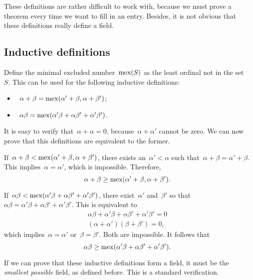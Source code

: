 \begin{remark}
  These definitions are rather difficult to work with, because we must prove a theorem every time we want to fill in an entry. Besides, it is not obvious that these definitions really define a field.
\end{remark}

\subsection{Inductive definitions}
Define the minimal excluded number~$\operatorname{mex}(S)$ as the least ordinal not in the set~$S$. This can be used for the following inductive definitions:
\begin{itemize}
  \item~$\alpha + \beta = \operatorname{mex}(\alpha' + \beta, \alpha + \beta')$;
	\item~$\alpha\beta = \operatorname{mex}(\alpha'\beta + \alpha\beta' + \alpha'\beta')$.
\end{itemize}
It is easy to verify that~$\alpha + \alpha = 0$, because~$\alpha + \alpha'$ cannot be zero. We can now prove that this definitions are equivalent to the former.

If~$\alpha + \beta < \operatorname{mex}(\alpha' + \beta, \alpha + \beta')$, there exists an~$\alpha' < \alpha$ such that~$\alpha + \beta = \alpha' + \beta$. This implies~$\alpha = \alpha'$, which is impossible. Therefore,
\begin{equation}
  \alpha + \beta \geq \operatorname{mex}(\alpha' + \beta, \alpha + \beta').
\end{equation}

If~$\alpha\beta < \operatorname{mex}(\alpha'\beta + \alpha\beta' + \alpha'\beta')$, there exist~$\alpha'$ and~$\beta'$ so that~$\alpha\beta = \alpha'\beta + \alpha\beta' + \alpha'\beta'$. This is equivalent to
\begin{gather}
  \alpha\beta + \alpha'\beta + \alpha\beta' + \alpha'\beta' = 0 \\
  (\alpha + \alpha')(\beta + \beta') = 0 ,
\end{gather}
which implies~$\alpha = \alpha'$ or~$\beta = \beta'$. Both are impossible. It follows that
\begin{equation}
  \alpha\beta \geq \operatorname{mex}(\alpha'\beta + \alpha\beta' + \alpha'\beta').
\end{equation}

If we can prove that these inductive definitions form a field, it must be the \emph{smallest possible} field, as defined before. This is a standard verification.

